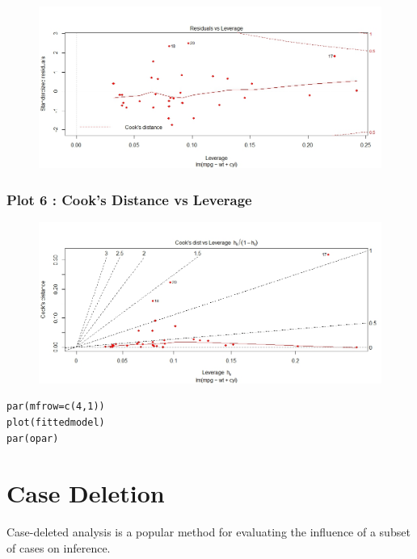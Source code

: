 \documentclass[12pt, a4paper]{article}
\theoremstyle{plain}
\theoremstyle{definition}
\theoremstyle{remark}
\begin{document}
\begin{figure}[h!]
\centering
\includegraphics[width=0.9\linewidth]{./mtcarsDiagPlot5}

\label{mtcarsDiagPlot5}
\end{figure}


\subsubsection{Plot 6 :  Cook's Distance vs Leverage}
\begin{figure}[h!]
\centering
\includegraphics[width=0.9\linewidth]{./mtcarsDiagPlot6}

\label{mtcarsDiagPlot6}
\end{figure}


\begin{framed}
\begin{verbatim}
par(mfrow=c(4,1))
plot(fittedmodel)
par(opar)
\end{verbatim}
\end{framed}


\newpage
\section{Case Deletion} %
Case-deleted analysis is a popular method for evaluating the inﬂuence of a subset of cases on inference.
\end{document}
